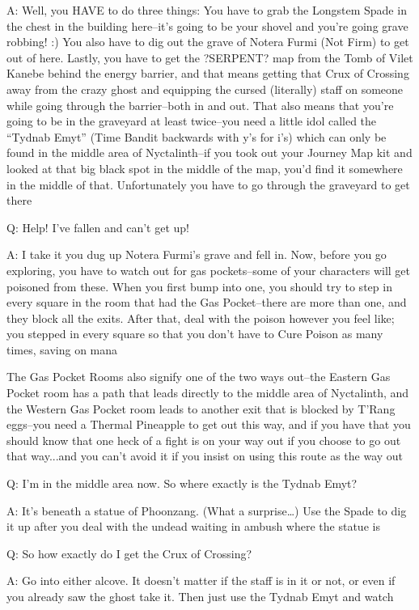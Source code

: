 \documentclass[12pt]{article}
\begin{document}
A: Well, you HAVE to do three things: You have to grab the Longstem
Spade in the chest in the building here--it's going to be your shovel
and you're going grave robbing! :) You also have to dig out the grave of
Notera Furmi (Not Firm) to get out of here. Lastly, you have to get the
?SERPENT? map from the Tomb of Vilet Kanebe behind the energy barrier,
and that means getting that Crux of Crossing away from the crazy ghost
and equipping the cursed (literally) staff on someone while going
through the barrier--both in and out. That also means that you're going
to be in the graveyard at least twice--you need a little idol called the
``Tydnab Emyt'' (Time Bandit backwards with y's for i's) which can only
be found in the middle area of Nyctalinth--if you took out your Journey
Map kit and looked at that big black spot in the middle of the map,
you'd find it somewhere in the middle of that. Unfortunately you have to
go through the graveyard to get there

Q: Help! I've fallen and can't get up!

A: I take it you dug up Notera Furmi's grave and fell in. Now, before
you go exploring, you have to watch out for gas pockets--some of your
characters will get poisoned from these. When you first bump into one,
you should try to step in every square in the room that had the Gas
Pocket--there are more than one, and they block all the exits. After
that, deal with the poison however you feel like; you stepped in every
square so that you don't have to Cure Poison as many times, saving on
mana

The Gas Pocket Rooms also signify one of the two ways out--the Eastern Gas
Pocket room has a path that leads directly to the middle area of
Nyctalinth, and the Western Gas Pocket room leads to another exit that is
blocked by T'Rang eggs--you need a Thermal Pineapple to get out this way,
and if you have that you should know that one heck of a fight is on your
way out if you choose to go out that way...and you can't avoid it if you
insist on using this route as the way out

Q: I'm in the middle area now. So where exactly is the Tydnab Emyt?

A: It's beneath a statue of Phoonzang. (What a surprise\ldots{}) Use the
Spade to dig it up after you deal with the undead waiting in ambush
where the statue is

Q: So how exactly do I get the Crux of Crossing?

A: Go into either alcove. It doesn't matter if the staff is in it or
not, or even if you already saw the ghost take it. Then just use the
Tydnab Emyt and watch
\end{document}
